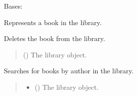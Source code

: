 \documentclass[letterpaper,10pt,english,openany,oneside]{sphinxmanual}
\begin{document}
\begin{fulllineitems}
\label{\detokenize{book:book.Book}}
\pysigstartsignatures
{}
\pysigstopsignatures
\sphinxAtStartPar
Bases: 

\sphinxAtStartPar
Represents a book in the library.

\begin{fulllineitems}
\label{\detokenize{book:book.Book.delete}}
\pysigstartsignatures
{}
\pysigstopsignatures
\sphinxAtStartPar
Deletes the book from the library.
\begin{quote}\begin{description}
\sphinxAtStartPar
{} ({\hyperref[\detokenize{library:library.Library}]{}}) \textendash{} The library object.

\end{description}\end{quote}

\end{fulllineitems}


\begin{fulllineitems}
\label{\detokenize{book:book.Book.search_by_author}}
\pysigstartsignatures
{}
\pysigstopsignatures
\sphinxAtStartPar
Searches for books by author in the library.
\begin{quote}\begin{description}
\begin{itemize}
\item {} 
\sphinxAtStartPar
{} ({\hyperref[\detokenize{library:library.Library}]{}}) \textendash{} The library object.


\end{itemize}
\end{description}
\end{quote}
\end{fulllineitems}
\end{fulllineitems}
\end{document}
